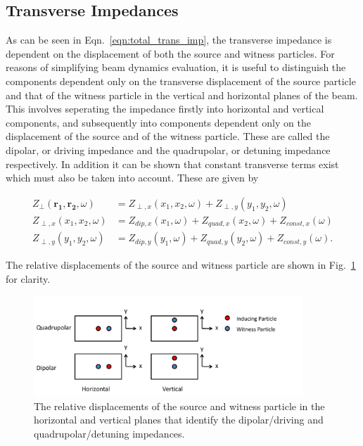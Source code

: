 \subsection{Transverse Impedances}

As can be seen in Eqn.~\ref{eqn:total_trans_imp}, the transverse impedance is dependent on the displacement of both the source and witness particles. For reasons of simplifying beam dynamics evaluation, it is useful to distinguish the components dependent only on the transverse displacement of the source particle and that of the witness particle in the vertical and horizontal planes of the beam. This involves seperating the impedance firstly into horizontal and vertical components, and subsequently into components dependent only on the displacement of the source and of the witness particle. These are called the dipolar, or driving impedance and the quadrupolar, or detuning impedance respectively. In addition it can be shown that constant transverse terms exist which must also be taken into account. These are given by

\begin{align}
Z_{\perp} \left(\mathbf{r_{1}}, \mathbf{r_{2}}, \omega  \right)  &= Z_{\perp, x} \left( x_{1}, x_{2}, \omega \right) + Z_{\perp, y} \left( y_{1}, y_{2}, \omega \right) \\
Z_{\perp, x} \left( x_{1}, x_{2}, \omega \right) &= Z_{dip, x} \left( x_{1}, \omega  \right) + Z_{quad, x} \left( x_{2}, \omega  \right) + Z_{const, x} \left( \omega  \right) \\
Z_{\perp, y} \left( y_{1}, y_{2}, \omega \right) &= Z_{dip, y} \left( y_{1}, \omega  \right) + Z_{quad, y} \left( y_{2}, \omega  \right) + Z_{const, y} \left( \omega  \right).
\end{align}

The relative displacements of the source and witness particle are shown in Fig.~\ref{fig:trans_imp_disp} for clarity.

\begin{figure}
\begin{center}
\includegraphics[width=0.9\textwidth]{Wakefields_and_Impedances/figures/impedance-des.pdf}
\end{center}
\caption{The relative displacements of the source and witness particle in the horizontal and vertical planes that identify the dipolar/driving and quadrupolar/detuning impedances.}
\label{fig:trans_imp_disp}
\end{figure}

